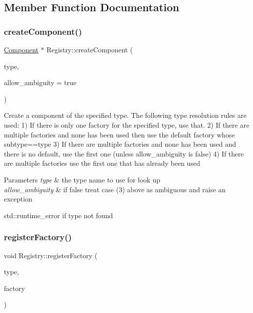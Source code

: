 \subsection{Member Function Documentation}
\mbox{\label{classtheoria_1_1core_1_1Registry_a846b6ea01b2c4d3d1276796e9ef2b32b}} 
\subsubsection{\texorpdfstring{create\+Component()}{createComponent()}}
{\footnotesize\ttfamily \hyperlink{classtheoria_1_1core_1_1Component}{Component} $\ast$ Registry\+::create\+Component (\begin{DoxyParamCaption}\item[{const Type\+Name \&}]{type,  }\item[{int}]{allow\+\_\+ambiguity = {\ttfamily true} }\end{DoxyParamCaption})}

Create a component of the specified type. The following type resolution rules are used\+: 1) If there is only one factory for the specified type, use that. 2) If there are multiple factories and none has been used then use the default factory whose subtype==type 3) If there are multiple factories and none has been used and there is no default, use the first one (unless allow\+\_\+ambiguity is false) 4) If there are multiple factories use the first one that has already been used


\begin{DoxyParams}{Parameters}
{\em type} & the type name to use for look up \\
\hline
{\em allow\+\_\+ambiguity} & if false treat case (3) above as ambiguous and raise an exception\\
\hline
\end{DoxyParams}
std\+::runtime\+\_\+error if type not found \mbox{\label{classtheoria_1_1core_1_1Registry_ac7cd0cefa7207f2f6c602723cc32ee49}} 
\subsubsection{\texorpdfstring{register\+Factory()}{registerFactory()}\hspace{0.1cm}{\footnotesize\ttfamily [1/2]}}
{\footnotesize\ttfamily void Registry\+::register\+Factory (\begin{DoxyParamCaption}\item[{const Type\+Name \&}]{type,  }\item[{Component\+Factory}]{factory }\end{DoxyParamCaption})}

